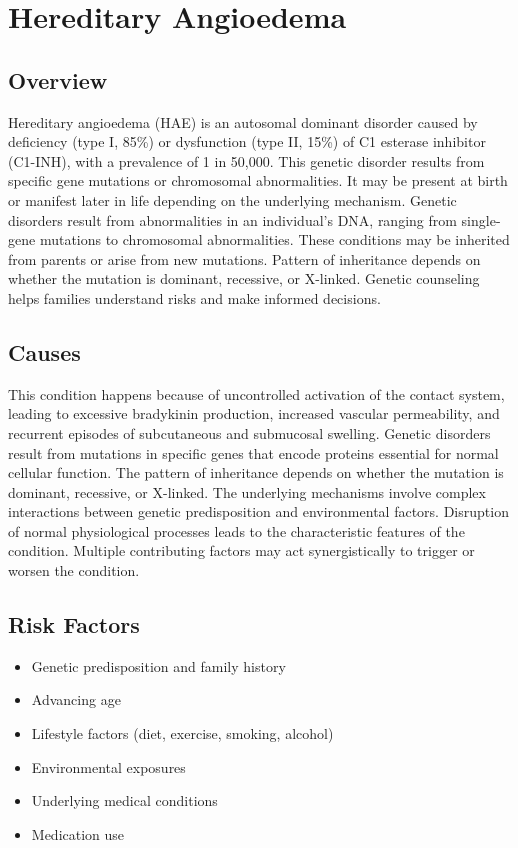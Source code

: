 \chapter{Hereditary Angioedema}
\label{sec:Hereditary Angioedema}

\section{Overview}
Hereditary angioedema (HAE) is an autosomal dominant disorder caused by deficiency (type I, 85\%) or dysfunction (type II, 15\%) of C1 esterase inhibitor (C1-INH), with a prevalence of 1 in 50,000. This genetic disorder results from specific gene mutations or chromosomal abnormalities. It may be present at birth or manifest later in life depending on the underlying mechanism. Genetic disorders result from abnormalities in an individual's DNA, ranging from single-gene mutations to chromosomal abnormalities. These conditions may be inherited from parents or arise from new mutations. Pattern of inheritance depends on whether the mutation is dominant, recessive, or X-linked. Genetic counseling helps families understand risks and make informed decisions.
\section{Causes}
This condition happens because of uncontrolled activation of the contact system, leading to excessive bradykinin production, increased vascular permeability, and recurrent episodes of subcutaneous and submucosal swelling. Genetic disorders result from mutations in specific genes that encode proteins essential for normal cellular function. The pattern of inheritance depends on whether the mutation is dominant, recessive, or X-linked. The underlying mechanisms involve complex interactions between genetic predisposition and environmental factors. Disruption of normal physiological processes leads to the characteristic features of the condition. Multiple contributing factors may act synergistically to trigger or worsen the condition.
\section{Risk Factors}


\begin{itemize}[noitemsep]
  \item Genetic predisposition and family history
  \item Advancing age
  \item Lifestyle factors (diet, exercise, smoking, alcohol)
  \item Environmental exposures
  \item Underlying medical conditions
  \item Medication use
\end{itemize}
